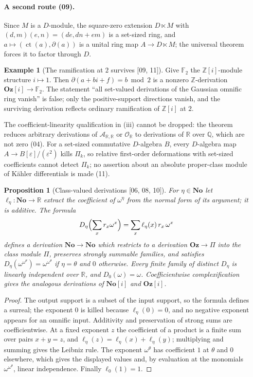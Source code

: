 \documentclass[11pt,letterpaper]{article}
\numberwithin{equation}{section}
\newtheorem{proposition}[proposition]{Proposition}
\theoremstyle{definition}
\newtheorem{example}[example]{Example}
\theoremstyle{remark}
\theoremstyle{plain}
\newcommand{\No}{\mathbf{No}}
\newcommand{\Oz}{\mathbf{Oz}}
\newcommand{\SC}{\No[i]}
\newcommand{\GOz}{\Oz[i]}
\newcommand{\Z}{\mathbb Z}
\newcommand{\Q}{\mathbb Q}
\newcommand{\R}{\mathbb R}
\newcommand{\F}{\mathbb F}
\newcommand{\A}{\mathcal A}          %
\newcommand{\OO}{\mathcal O}         %
\newcommand{\ct}{\operatorname{ct}}
\newcommand{\src}[1]{\textup{\textsf{[#1]}}}
\begin{document}
\paragraph{A second route (09).} Since $M$ is a $D$-module, the square-zero extension
$D\ltimes M$ with $(d,m)(e,n)=(de,dn+em)$ is a set-sized ring, and $a\mapsto(\ct(a),\partial(a))$
is a unital ring map $A\to D\ltimes M$; the universal theorem forces it to factor through
$D$.

\begin{example}[The ramification at $2$ survives \src{09, 11}]\label{osq:ex:ramification}
Give $\F_2$ the $\Z[i]$-module structure $i\mapsto1$. Then $\partial(a+bi+f)=b\bmod2$ is a
nonzero $\Z$-derivation $\GOz\to\F_2$. The statement ``all set-valued derivations of the
Gaussian omnific ring vanish'' is false; only the positive-support directions vanish, and
the surviving derivation reflects ordinary ramification of $\Z[i]$ at $2$.
\end{example}

The coefficient-linearity qualification in (iii) cannot be dropped: the theorem reduces
arbitrary derivations of $\A_{\R,\R}$ or $\OO_\R$ to derivations of $\R$ over $\Q$, which
are not zero (04). For a set-sized commutative $D$-algebra $B$, every $D$-algebra map
$A\to B[\varepsilon]/(\varepsilon^2)$ kills $\Pi_k$, so relative first-order deformations
with set-sized coefficients cannot detect $\Pi_k$; no assertion about an absolute
proper-class module of K\"ahler differentials is made (11).

\begin{proposition}[Class-valued derivations \src{06, 08, 10}]\label{osq:prop:classder}
For $\eta\in\No$ let $\ell_\eta:\No\to\R$ extract the coefficient of $\omega^\eta$ from the
normal form of its argument; it is additive. The formula
\[
 D_\eta\Bigl(\sum_x r_x\omega^x\Bigr)=\sum_x \ell_\eta(x)\,r_x\,\omega^x
\]
defines a derivation $\No\to\No$ which restricts to a derivation $\Oz\to\Pi$ into the
class module $\Pi$, preserves strongly summable families, and satisfies
$D_\eta(\omega^{\omega^\theta})=\omega^{\omega^\theta}$ if $\eta=\theta$ and $0$ otherwise.
Every finite family of distinct $D_\eta$ is linearly independent over $\R$, and
$D_0(\omega)=\omega$. Coefficientwise complexification gives the analogous derivations of
$\SC$ and $\GOz$.
\end{proposition}
\begin{proof}
The output support is a subset of the input support, so the formula defines a surreal; the
exponent $0$ is killed because $\ell_\eta(0)=0$, and no negative exponent appears for an
omnific input. Additivity and preservation of strong sums are coefficientwise. At a fixed
exponent $z$ the coefficient of a product is a finite sum over pairs $x+y=z$, and
$\ell_\eta(z)=\ell_\eta(x)+\ell_\eta(y)$; multiplying and summing gives the Leibniz rule.
The exponent $\omega^\theta$ has coefficient $1$ at $\theta$ and $0$ elsewhere, which gives
the displayed values and, by evaluation at the monomials $\omega^{\omega^\theta}$, linear
independence. Finally $\ell_0(1)=1$.
\end{proof}
\end{document}
